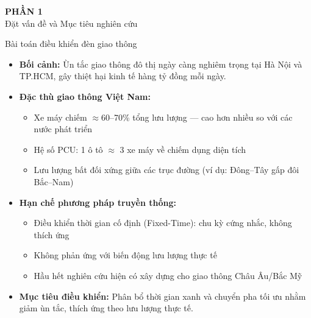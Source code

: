 
\begin{frame}
  \centering
  \Huge \textbf{PHẦN 1} \\[0.5cm]
  \LARGE Đặt vấn đề và Mục tiêu nghiên cứu
\end{frame}

\begin{frame}{Bài toán điều khiển đèn giao thông}
\begin{itemize}
    \item \textbf{Bối cảnh:} Ùn tắc giao thông đô thị ngày càng nghiêm trọng tại Hà Nội và TP.HCM, gây thiệt hại kinh tế hàng tỷ đồng mỗi ngày.
    \item \textbf{Đặc thù giao thông Việt Nam:}
    \begin{itemize}
        \item Xe máy chiếm $\approx$60--70\% tổng lưu lượng — cao hơn nhiều so với các nước phát triển
        \item Hệ số PCU: 1 ô tô $\approx$ 3 xe máy về chiếm dụng diện tích
        \item Lưu lượng bất đối xứng giữa các trục đường (ví dụ: Đông–Tây gấp đôi Bắc–Nam)
    \end{itemize}
    \item \textbf{Hạn chế phương pháp truyền thống:}
    \begin{itemize}
        \item Điều khiển thời gian cố định (Fixed-Time): chu kỳ cứng nhắc, không thích ứng
        \item Không phản ứng với biến động lưu lượng thực tế
        \item Hầu hết nghiên cứu hiện có xây dựng cho giao thông Châu Âu/Bắc Mỹ
    \end{itemize}
    \item \textbf{Mục tiêu điều khiển:} Phân bổ thời gian xanh và chuyển pha tối ưu nhằm giảm ùn tắc, thích ứng theo lưu lượng thực tế.
\end{itemize}
\end{frame}

